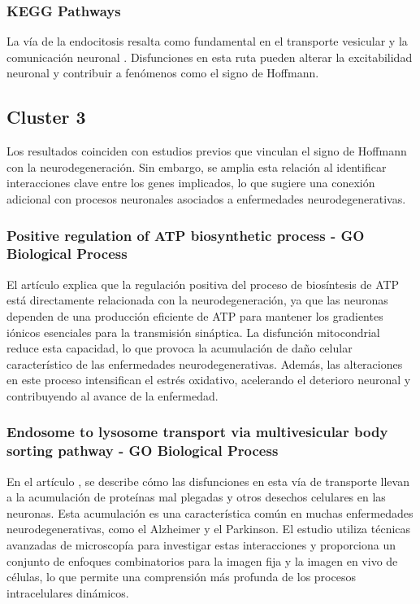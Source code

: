 \subsubsection{KEGG Pathways}

La vía de la endocitosis resalta como fundamental en el transporte vesicular y la comunicación neuronal \cite{Chanaday8209}. Disfunciones en esta ruta pueden alterar la excitabilidad neuronal y contribuir a fenómenos como el signo de Hoffmann.


\subsection{Cluster 3}

Los resultados coinciden con estudios previos que vinculan el signo de Hoffmann con la neurodegeneración. Sin embargo, se amplia esta relación al identificar interacciones clave entre los genes implicados, lo que sugiere una conexión adicional con procesos neuronales asociados a enfermedades neurodegenerativas.

\subsubsection{Positive regulation of ATP biosynthetic process - GO Biological Process}
El artículo \cite{Bonvento2017} explica que la regulación positiva del proceso de biosíntesis de ATP está directamente relacionada con la neurodegeneración, ya que las neuronas dependen de una producción eficiente de ATP para mantener los gradientes iónicos esenciales para la transmisión sináptica. La disfunción mitocondrial reduce esta capacidad, lo que provoca la acumulación de daño celular característico de las enfermedades neurodegenerativas. Además, las alteraciones en este proceso intensifican el estrés oxidativo, acelerando el deterioro neuronal y contribuyendo al avance de la enfermedad. 

\subsubsection{Endosome to lysosome transport via multivesicular body sorting pathway - GO Biological Process}
En el artículo \cite{Mulligan2023}, se describe cómo las disfunciones en esta vía de transporte llevan a la acumulación de proteínas mal plegadas y otros desechos celulares en las neuronas. Esta acumulación es una característica común en muchas enfermedades neurodegenerativas, como el Alzheimer y el Parkinson. El estudio utiliza técnicas avanzadas de microscopía para investigar estas interacciones y proporciona un conjunto de enfoques combinatorios para la imagen fija y la imagen en vivo de células, lo que permite una comprensión más profunda de los procesos intracelulares dinámicos.


